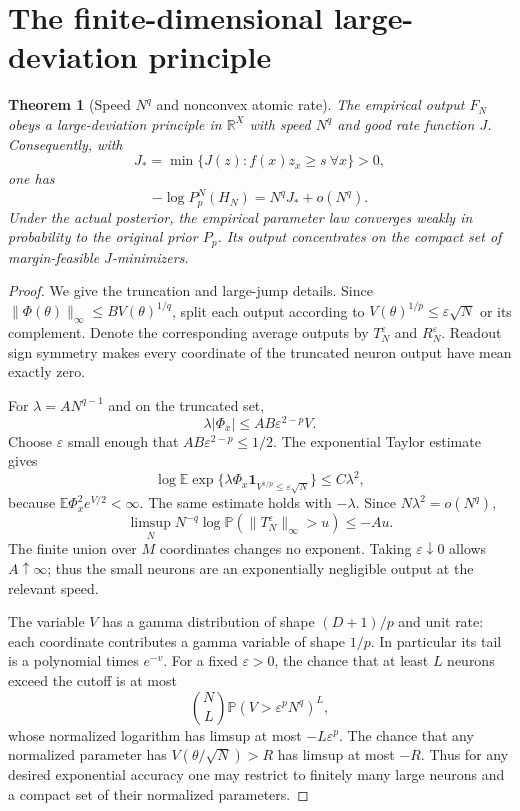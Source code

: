 \documentclass[11pt]{article}
\newtheorem{theorem}{Theorem}\newtheorem{lemma}[theorem]{Lemma}
\newcommand{\E}{\mathbb E}\newcommand{\Pp}{\mathbb P}
\newcommand{\R}{\mathbb R}\newcommand{\relu}{\operatorname{ReLU}}
\newcommand{\one}{\mathbf1}
\begin{document}
\section{The finite-dimensional large-deviation principle}
\begin{theorem}[Speed $N^q$ and nonconvex atomic rate]
The empirical output $F_N$ obeys a large-deviation principle in
$\R^X$ with speed $N^q$ and good rate function $J$.
Consequently, with
\[
 J_* =\min\{J(z): f(x)z_x\ge s\ \forall x\}>0,
\]
one has
\[
 -\log P_p^N(H_N)=N^qJ_*+o(N^q).                          \tag{2}
\]
Under the actual posterior, the empirical parameter law converges weakly
in probability to the original prior $P_p$. Its output concentrates on
the compact set of margin-feasible $J$-minimizers.
\end{theorem}
\begin{proof}
We give the truncation and large-jump details. Since
$\|\Phi(\theta)\|_\infty\le BV(\theta)^{1/q}$, split each output
according to $V(\theta)^{1/p}\le\varepsilon\sqrt N$ or its complement.
Denote the corresponding average outputs by $T_N^\varepsilon$ and
$R_N^\varepsilon$. Readout sign symmetry makes every coordinate of the
truncated neuron output have mean exactly zero.

For $\lambda=A N^{q-1}$ and on the truncated set,
\[
 \lambda|\Phi_x|\le AB\varepsilon^{2-p}V.
\]
Choose $\varepsilon$ small enough that $AB\varepsilon^{2-p}\le1/2$.
The exponential Taylor estimate gives
\[
 \log\E\exp\{\lambda\Phi_x\one_{V^{1/p}\le\varepsilon\sqrt N}\}
 \le C\lambda^2,
\]
because $\E\Phi_x^2e^{V/2}<\infty$. The same estimate holds with
$-\lambda$. Since $N\lambda^2=o(N^q)$,
\[
 \limsup_N N^{-q}\log\Pp(\|T_N^\varepsilon\|_\infty>u)
 \le-Au.                                                 \tag{3}
\]
The finite union over $M$ coordinates changes no exponent. Taking
$\varepsilon\downarrow0$ allows $A\uparrow\infty$; thus the small
neurons are an exponentially negligible output at the relevant speed.

The variable $V$ has a gamma distribution of shape $(D+1)/p$ and
unit rate: each coordinate contributes a gamma variable of shape $1/p$.
In particular its tail is a polynomial times $e^{-v}$. For a fixed
$\varepsilon>0$, the chance that at least $L$ neurons exceed the cutoff
is at most
\[
 \binom NL\Pp(V>\varepsilon^pN^q)^L,
\]
whose normalized logarithm has limsup at most $-L\varepsilon^p$.
The chance that any normalized parameter has
$V(\theta/\sqrt N)>R$ has limsup at most $-R$.
Thus for any desired exponential accuracy one may restrict to finitely
many large neurons and a compact set of their normalized parameters.


\end{proof}
\end{document}
